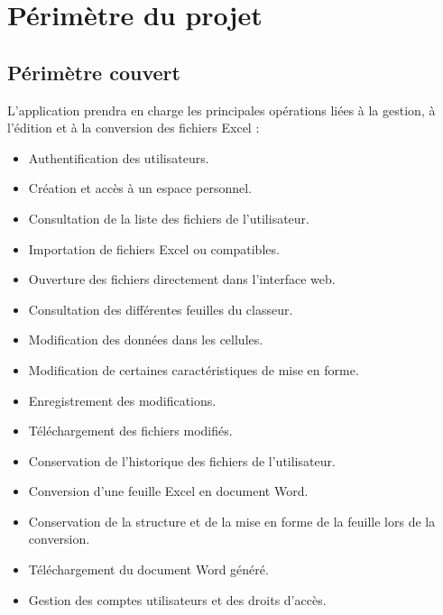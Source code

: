 \chapter{Périmètre du projet}

\section{Périmètre couvert}

L'application prendra en charge les principales opérations liées à la gestion, à l'édition et à la conversion des fichiers Excel :

\begin{itemize}
    \item Authentification des utilisateurs.
    \item Création et accès à un espace personnel.
    \item Consultation de la liste des fichiers de l'utilisateur.
    \item Importation de fichiers Excel ou compatibles.
    \item Ouverture des fichiers directement dans l'interface web.
    \item Consultation des différentes feuilles du classeur.
    \item Modification des données dans les cellules.
    \item Modification de certaines caractéristiques de mise en forme.
    \item Enregistrement des modifications.
    \item Téléchargement des fichiers modifiés.
    \item Conservation de l'historique des fichiers de l'utilisateur.
    \item Conversion d'une feuille Excel en document Word.
    \item Conservation de la structure et de la mise en forme de la feuille lors de la conversion.
    \item Téléchargement du document Word généré.
    \item Gestion des comptes utilisateurs et des droits d'accès.
\end{itemize}
